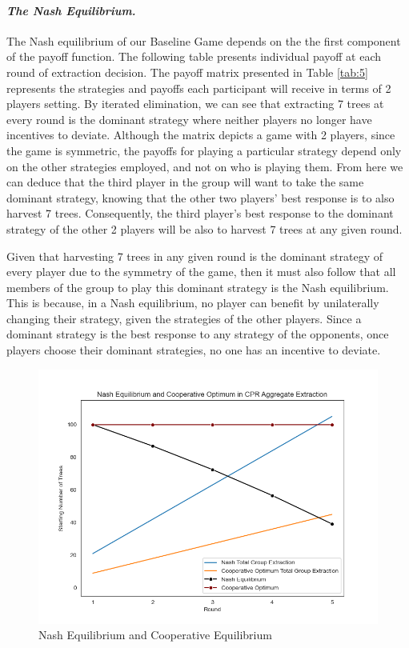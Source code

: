 \paragraph{\textit{The Nash Equilibrium.}}
The Nash equilibrium of our Baseline Game depends on the the first component of the payoff function. The following table presents individual payoff at each round of extraction decision. The payoff matrix presented in Table \ref{tab:5} represents the strategies and payoffs each participant will receive in terms of 2 players setting. By iterated elimination, we can see that extracting 7 trees at every round is the dominant strategy where neither players no longer have incentives to deviate. Although the matrix depicts a game with 2 players, since the game is symmetric, the payoffs for playing a particular strategy depend only on the other strategies employed, and not on who is playing them. From here we can deduce that the third player in the group will want to take the same dominant strategy, knowing that the other two players' best response is to also harvest 7 trees. Consequently, the third player's best response to the dominant strategy of the other 2 players will be also to harvest 7 trees at any given round.




\noindent Given that harvesting 7 trees in any given round is the dominant strategy of every player due to the symmetry of the game, then it must also follow that all members of the group to play this dominant strategy is the Nash equilibrium. This is because, in a Nash equilibrium, no player can benefit by unilaterally changing their strategy, given the strategies of the other players. Since a dominant strategy is the best response to any strategy of the opponents, once players choose their dominant strategies, no one has an incentive to deviate.

\begin{figure}[H]
  \centering
  \includegraphics[width=0.7\linewidth]{../bld/graphs/0.Nash&Cooperative Baseline.png}
  \caption{Nash Equilibrium and Cooperative Equilibrium}\label{fig:nash&cooperative}
\end{figure}

